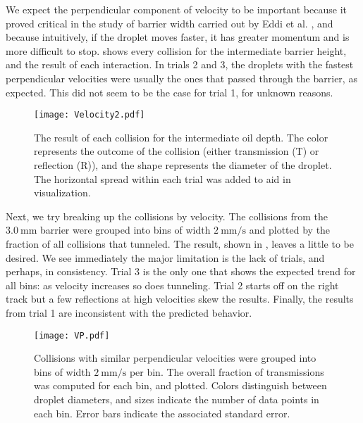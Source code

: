 We expect the perpendicular component of velocity to be important because it proved critical in the study of barrier width carried out by Eddi et al. , and because intuitively, if the droplet moves faster, it has greater momentum and is more difficult to stop.  shows every collision for the intermediate barrier height, and the result of each interaction. In trials 2 and 3, the droplets with the fastest perpendicular velocities were usually the ones that passed through the barrier, as expected. This did not seem to be the case for trial 1, for unknown reasons. 

\begin{figure}[h!]
	\centering
	\texttt{[image: Velocity2.pdf]}
	\caption{The result of each collision for the intermediate oil depth. The color represents the outcome of the collision (either transmission (T) or reflection (R)), and the shape represents the diameter of the droplet. The horizontal spread within each trial was added to aid in visualization.}
	\label{vel}
\end{figure}

Next, we try breaking up the collisions by velocity. The collisions from the $3.0~\mathrm{mm}$ barrier were grouped into bins of width $2~\mathrm{mm/s}$ and plotted by the fraction of all collisions that tunneled. The result, shown in , leaves a little to be desired. We see immediately the major limitation is the lack of trials, and perhaps, in consistency. Trial 3 is the only one that shows the expected trend for all bins: as velocity increases so does tunneling. Trial 2 starts off on the right track but a few reflections at high velocities skew the results. Finally, the results from trial 1 are inconsistent with the predicted behavior.
\begin{figure}[h!]
	\centering
	\texttt{[image: VP.pdf]}
	\caption{Collisions with similar perpendicular velocities were grouped into bins of width $2~\mathrm{mm/s}$ per bin. The overall fraction of transmissions was computed for each bin, and plotted. Colors distinguish between droplet diameters, and sizes indicate the number of data points in each bin. Error bars indicate the associated standard error. }
	\label{VP}
\end{figure}

